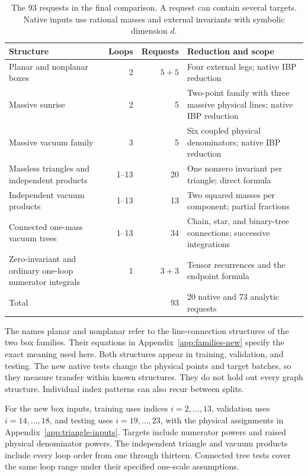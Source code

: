 \begin{table}[!htbp]\centering\small
\caption{The 93 requests in the final comparison. A request can contain several targets. Native inputs use rational masses and external invariants with symbolic dimension $d$.}
\label{tab:coverage}
\begin{tabularx}{\linewidth}{@{}YrrY@{}}\toprule
Structure & Loops & Requests & Reduction and scope\\\midrule
Planar and nonplanar boxes & 2 & $5+5$ & Four external legs; native IBP reduction\\
Massive sunrise & 2 & 5 & Two-point family with three massive physical lines; native IBP reduction\\
Massive vacuum family & 3 & 5 & Six coupled physical denominators; native IBP reduction\\
Massless triangles and independent products & 1--13 & 20 & One nonzero invariant per triangle; direct formula\\
Independent vacuum products & 1--13 & 13 & Two squared masses per component; partial fractions\\
Connected one-mass vacuum trees & 1--13 & 34 & Chain, star, and binary-tree connections; successive integrations\\
Zero-invariant and ordinary one-loop numerator integrals & 1 & $3+3$ & Tensor recurrences and the endpoint formula\\\midrule
Total & & 93 & 20 native and 73 analytic requests\\\bottomrule
\end{tabularx}
\end{table}
The names planar and nonplanar refer to the line-connection structures of the two box families. Their equations in Appendix~\ref{app:families-new} specify the exact meaning used here. Both structures appear in training, validation, and testing. The new native tests change the physical points and target batches, so they measure transfer within known structures. They do not hold out every graph structure. Individual index patterns can also recur between splits.

For the new box inputs, training uses indices $i=2,\ldots,13$, validation uses $i=14,\ldots,18$, and testing uses $i=19,\ldots,23$, with the physical assignments in Appendix~\ref{app:triangle-inputs}. Targets include numerator powers and raised physical denominator powers. The independent triangle and vacuum products include every loop order from one through thirteen. Connected tree tests cover the same loop range under their specified one-scale assumptions.

